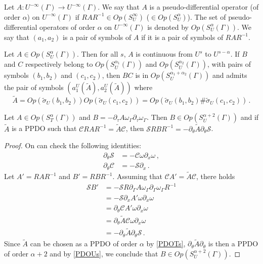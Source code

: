 \documentclass[a4paper]{article}
\begin{document}
\begin{Def}
	Let $A : U^{-\infty}(\Gamma) \to U^{-\infty}(\Gamma)$. We say that $A$ is a pseudo-differential operator (of order $\alpha$) on $U^{-\infty}(\Gamma)$ if $R A R^{-1} \in Op(S^{\infty}_U)$ ($\in Op(S_U^{\alpha})$). The set of pseudo-differential operators of order $\alpha$ on $U^{-\infty}(\Gamma)$ is denoted by $\textit{Op}(S^{\alpha}_U(\Gamma))$. We say that $(a_1,a_2)$ is a pair of symbols of $A$ if it is a pair of symbols of $RAR^{-1}$.  
\end{Def}
\begin{Cor}
	Let $A \in \textit{Op}(S^\alpha_U(\Gamma))$. Then for all $s$, $A$ is continuous from $U^s$ to $U^{s - \alpha}$. If $B$ and $C$ respectively belong to $\textit{Op}(S^{\alpha_1}_U(\Gamma))$ and $\textit{Op}(S^{\alpha_2}_U(\Gamma))$, with pairs of symbols $(b_1,b_2)$ and $(c_1,c_2)$, then $BC$ is in $\textit{Op}(S^{\alpha_1 + \alpha_2}_U(\Gamma))$ and admits the pair of symbols $(a_1^U(\tilde{A}),a_2^U(\tilde{A}))$ where
	\[\tilde{A} = \textit{Op}(\tilde{\sigma}_U(b_1,b_2)) \textit{Op}(\tilde{\sigma}_U(c_1,c_2)) = \textit{Op}(\tilde{\sigma}_U(b_1,b_2)\#\tilde{\sigma}_U(c_1,c_2))\,.\]
\end{Cor}
\begin{Lem}
	Let $A \in \textit{Op}(S_T^{\alpha}(\Gamma))$ and $B = -\partial_\tau A \omega_\Gamma \partial_\tau \omega_\Gamma$. Then $B \in \textit{Op}(S_U^{\alpha+2}(\Gamma))$ and if $\tilde{A}$ is a PPDO such that $\mathcal{C}RAR^{-1} = \tilde{A} \mathcal{C}$, then $\mathcal{S}RBR^{-1} = -\partial_\theta \tilde{A} \partial_\theta \mathcal{S}$.
	\label{LemdxAomegadeomega}
\end{Lem}
\begin{proof}
	On can check the following identities:
	\begin{align*}
	\partial_\theta \mathcal{S} &= - \mathcal{C} \omega \partial_x \omega \,,\\
	\partial_\theta \mathcal{C} &= - \mathcal{S} \partial_x\,.
	\end{align*}
	Let $A' = RAR^{-1}$ and $B' = RBR^{-1}$. Assuming that $\mathcal{C} A' = \tilde{A} \mathcal{C}$, there holds
	\begin{align*}
	\mathcal{S}B' &= -\mathcal{S}R \partial_\Gamma A \omega_\Gamma \partial_\Gamma \omega_\Gamma R^{-1}\\
	&= -\mathcal{S}\partial_x A' \omega \partial_x \omega\\
	&=\partial_\theta \mathcal{C}A'\omega \partial_x \omega\\
	&=\partial_\theta \tilde{A} \mathcal{C} \omega \partial_x\omega\\
	&= -\partial_\theta \tilde{A} \partial_\theta \mathcal{S}\,.
	\end{align*}
	Since $\tilde{A}$ can be chosen as a PPDO of order $\alpha$ by \autoref{PDOTs}, $\partial_\theta \tilde{A} \partial_\theta$ is then a PPDO of order $\alpha +2 $ and by \autoref{PDOUs}, we conclude that $B \in \textit{Op}(S_U^{\alpha + 2}(\Gamma))$.  
\end{proof}
\end{document}
